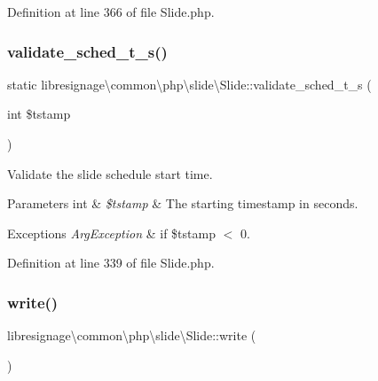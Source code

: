 Definition at line 366 of file Slide.\+php.

\mbox{\label{classlibresignage_1_1common_1_1php_1_1slide_1_1Slide_ad72fcaca412b7c9afe31cd5902b42457}} 
\subsubsection{\texorpdfstring{validate\+\_\+sched\+\_\+t\+\_\+s()}{validate\_sched\_t\_s()}}
{\footnotesize\ttfamily static libresignage\textbackslash{}common\textbackslash{}php\textbackslash{}slide\textbackslash{}\+Slide\+::validate\+\_\+sched\+\_\+t\+\_\+s (\begin{DoxyParamCaption}\item[{int}]{\$tstamp }\end{DoxyParamCaption})\hspace{0.3cm}{\ttfamily [static]}}

Validate the slide schedule start time.


\begin{DoxyParams}[1]{Parameters}
int & {\em \$tstamp} & The starting timestamp in seconds.\\
\hline
\end{DoxyParams}

\begin{DoxyExceptions}{Exceptions}
{\em Arg\+Exception} & if \$tstamp $<$ 0. \\
\hline
\end{DoxyExceptions}


Definition at line 339 of file Slide.\+php.

\mbox{\label{classlibresignage_1_1common_1_1php_1_1slide_1_1Slide_a41efc7a55cef4e78c2c3ca37153f7b57}} 
\subsubsection{\texorpdfstring{write()}{write()}}
{\footnotesize\ttfamily libresignage\textbackslash{}common\textbackslash{}php\textbackslash{}slide\textbackslash{}\+Slide\+::write (\begin{DoxyParamCaption}{ }\end{DoxyParamCaption})}

